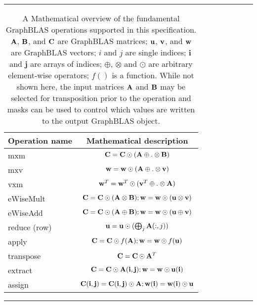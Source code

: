\begin{table}[h]
\hrule
\begin{center}
\caption{A Mathematical overview of the fundamental GraphBLAS operations supported
in this specification. ${\bf A}$, ${\bf B}$, and ${\bf C}$ are GraphBLAS matrices; 
${\bf u}$, ${\bf v}$, and ${\bf w}$ are GraphBLAS vectors; $i$ and $j$ are single indices;
$\mathbf{i}$ and $\mathbf{j}$ are arrays of indices;
$\oplus$, $\otimes$ and $\odot$ are arbitrary element-wise operators;  $f()$ is a function.
While not shown here, the input 
matrices ${\bf A}$ and ${\bf B}$ may be selected for transposition prior to 
the operation and masks can be used to control which values are written to the output GraphBLAS object.}
\label{Tab:GraphBLASOps}
\begin{tabular}{l|rrl}
{\sf Operation name} & \multicolumn{3}{c}{Mathematical description}  \\
\hline
{\sf mxm}          & \multicolumn{3}{c}{${\bf C}   = {\bf C}   \odot ({\bf A} \oplus.\otimes {\bf B})$} \\
{\sf mxv}          & \multicolumn{3}{c}{${\bf w}   = {\bf w}   \odot ({\bf A} \oplus.\otimes {\bf v)}$} \\
{\sf vxm}          & \multicolumn{3}{c}{${\bf w}^T = {\bf w}^T \odot ({\bf v}^T \oplus.\otimes {\bf A})$}  \\
{\sf eWiseMult}    & \multicolumn{3}{c}{${\bf C} = {\bf C} \odot ({\bf A} \otimes {\bf B}) ; {\bf w} = {\bf w} \odot ({\bf u} \otimes {\bf v})$} \\
{\sf eWiseAdd}     & \multicolumn{3}{c}{${\bf C} = {\bf C} \odot ({\bf A} \oplus {\bf B}) ; {\bf w} = {\bf w} \odot ({\bf u} \oplus {\bf v})$} \\
{\sf reduce} (row) & \multicolumn{3}{c}{${\bf u} = {\bf u} \odot (\bigoplus_j{\bf A}(:,j))$}  \\
	{\sf apply}        & \multicolumn{3}{c}{${\bf C} = {\bf C} \odot f({\bf A}) ; {\bf w} = {\bf w} \odot f({\bf u})$} \\
	{\sf transpose}    & \multicolumn{3}{c}{${\bf C} = {\bf C} \odot {\bf A}^T$} \\
	{\sf extract}      & \multicolumn{3}{c}{${\bf C} = {\bf C} \odot {\bf A}({\bf i},{\bf j}) ; {\bf w} = {\bf w} \odot {\bf u}({\bf i})$} \\
	{\sf assign}       & \multicolumn{3}{c}{${\bf C}({\bf i},{\bf j}) = {\bf C}({\bf i},{\bf j}) \odot {\bf A} ; {\bf w}({\bf i}) = {\bf w}({\bf i}) \odot {\bf u}$} \\
\end{tabular}
\end{center}
\hrule
\end{table}

